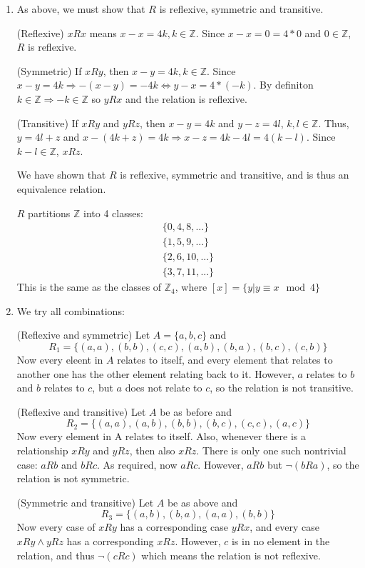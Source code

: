 \documentclass{article}
\begin{document}
\begin{enumerate}
    \item
        As above, we must show that $R$ is reflexive, symmetric and transitive.

        (Reflexive) $xRx$ means $x-x = 4k, k \in \mathbb{Z}$. Since $x-x = 0 = 4*0$ and $0 \in \mathbb{Z}$, $R$ is reflexive.

        (Symmetric) If $xRy$, then $x-y = 4k, k\in \mathbb{Z}$. Since $x-y=4k \Rightarrow -(x - y) = -4k \Leftrightarrow y - x = 4*(-k)$. By definiton $k \in \mathbb{Z} \Rightarrow -k \in \mathbb{Z}$ so $yRx$ and the relation is reflexive.

        (Transitive) If $xRy$ and $yRz$, then $x - y = 4k$ and $y - z = 4l$, $k,l \in \mathbb{Z}$. Thus, $y = 4l + z$ and $x - (4k + z) = 4k \Rightarrow x - z = 4k - 4l = 4(k - l)$. Since $k-l \in \mathbb{Z}$, $xRz$.

        We have shown that $R$ is reflexive, symmetric and transitive, and is thus an equivalence relation.

        $R$ partitions $\mathbb{Z}$ into 4 classes:
        \begin{align*}
            \{0,4,8, ...\} \\
            \{1,5,9, ...\} \\
            \{2, 6, 10, ...\} \\
            \{3, 7, 11, ...\}
        \end{align*}
        This is the same as the classes of $\mathbb{Z}_4$, where $[x] = \{ y | y \equiv x \mod{4}\}$


    \item
        We try all combinations:

        (Reflexive and symmetric) Let $A = \{a,b,c\}$ and
        $$R_1 = \{(a,a), (b,b), (c,c), (a,b), (b,a), (b,c), (c,b)\}$$ Now every eleent in $A$ relates to itself, and every element that relates to another one has the other element relating back to it. However, $a$ relates to $b$ and $b$ relates to $c$, but $a$ does not relate to $c$, so the relation is not transitive.

        (Reflexive and transitive) Let $A$ be as before and
        $$R_2 = \{(a,a), (a,b), (b,b), (b,c), (c,c), (a,c)\}$$
        Now every element in A relates to itself. Also, whenever there is a relationship $xRy$ and $yRz$, then also $xRz$. There is only one such nontrivial case: $aRb$ and $bRc$. As required, now $aRc$. However, $aRb$ but $\lnot(b R a)$, so the relation is not symmetric.

        (Symmetric and transitive) Let $A$ be as above and
        $$R_3 = \{(a,b),(b,a), (a,a), (b,b)\}$$
        Now every case of $xRy$ has a corresponding case $yRx$, and every case $xRy \land yRz$ has a corresponding $xRz$. However, $c$ is in no element in the relation, and thus $\lnot(cRc)$ which means the relation is not reflexive.


\end{enumerate}
\end{document}
